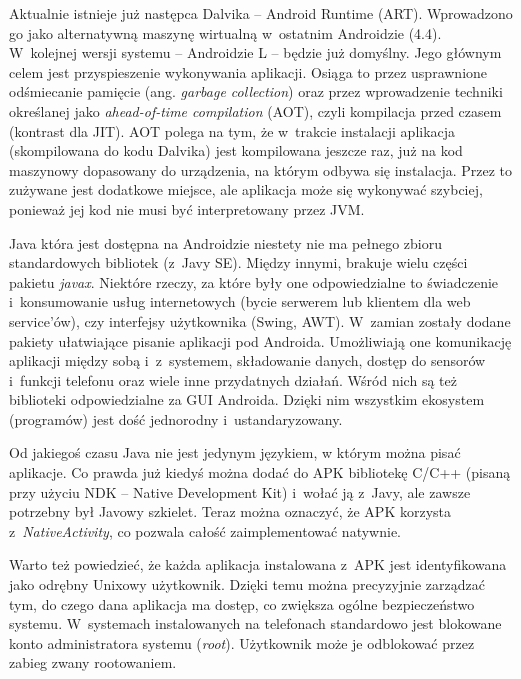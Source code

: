 Aktualnie istnieje już następca Dalvika -- Android Runtime (ART). Wprowadzono go jako alternatywną maszynę wirtualną w~ostatnim Androidzie (4.4)\cite{android-art}. W~kolejnej wersji systemu -- Androidzie L -- będzie już domyślny\cite{android-l-preview}. Jego głównym celem jest przyspieszenie wykonywania aplikacji. Osiąga to przez usprawnione odśmiecanie pamięcie (ang. \emph{garbage collection}) oraz przez wprowadzenie techniki określanej jako \emph{ahead-of-time compilation} (AOT), czyli kompilacja przed czasem (kontrast dla JIT). AOT polega na tym, że w~trakcie instalacji aplikacja (skompilowana do kodu Dalvika) jest kompilowana jeszcze raz, już na kod maszynowy dopasowany do urządzenia, na którym odbywa się instalacja. Przez to zużywane jest dodatkowe miejsce, ale aplikacja może się wykonywać szybciej, ponieważ jej kod nie musi być interpretowany przez JVM.

Java która jest dostępna na Androidzie niestety nie ma pełnego zbioru standardowych bibliotek (z~Javy SE). Między innymi, brakuje wielu części pakietu \emph{javax}. Niektóre rzeczy, za które były one odpowiedzialne to świadczenie i~konsumowanie usług internetowych (bycie serwerem lub klientem dla web service'ów), czy interfejsy użytkownika (Swing, AWT). W~zamian zostały dodane pakiety ułatwiające pisanie aplikacji pod Androida. Umożliwiają one komunikację aplikacji między sobą i~z~systemem, składowanie danych, dostęp do sensorów i~funkcji telefonu oraz wiele inne przydatnych działań\cite{android-package}. Wśród nich są też biblioteki odpowiedzialne za GUI Androida. Dzięki nim wszystkim ekosystem (programów) jest dość jednorodny i~ustandaryzowany.

Od jakiegoś czasu Java nie jest jedynym językiem, w którym można pisać aplikacje. Co prawda już kiedyś można dodać do APK bibliotekę C/C++ (pisaną przy użyciu NDK -- Native Development Kit\cite{android-ndk}) i~wołać ją z~Javy, ale zawsze potrzebny był Javowy szkielet. Teraz można oznaczyć, że APK korzysta z~\emph{NativeActivity}\cite{android-native-activity}, co pozwala całość zaimplementować natywnie. 

Warto też powiedzieć, że każda aplikacja instalowana z~APK jest identyfikowana jako odrębny Unixowy użytkownik\cite{android-permissions}. Dzięki temu można precyzyjnie zarządzać tym, do czego dana aplikacja ma dostęp, co zwiększa ogólne bezpieczeństwo systemu. W~systemach instalowanych na telefonach standardowo jest blokowane konto administratora systemu (\emph{root}). Użytkownik może je odblokować przez zabieg zwany rootowaniem.

